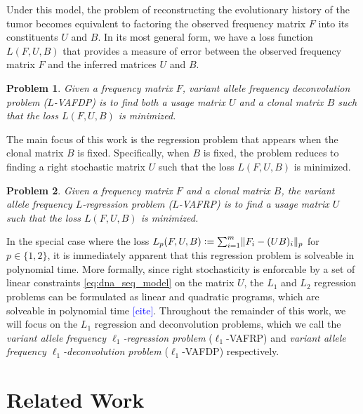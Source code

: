 \documentclass[10pt]{article}
\newtheorem{problem}{Problem}
\newcommand{\henri}[1]{\textcolor{blue}{[#1]}}
\newcommand{\defeq}{\vcentcolon=}
\begin{document}
Under this model, the problem of reconstructing the evolutionary history of the tumor
becomes equivalent to factoring the observed frequency matrix $F$ into its constituents $U$ and $B$.
In its most general form, we have a loss function $L(F, U, B)$ that provides a measure of error 
between the observed frequency matrix $F$ and the inferred matrices $U$ and $B$.

\begin{problem}
  \label{prob:vafp}
  Given a frequency matrix $F$, \emph{variant allele frequency deconvolution problem} ($L$-VAFDP) is to
  find both a usage matrix $U$ and a clonal matrix $B$ such that the loss $L(F, U, B)$ is minimized.
\end{problem}

The main focus of this work is the regression problem that appears when the
clonal matrix $B$ is fixed. Specifically, when $B$ is fixed, the problem reduces to finding a 
right stochastic matrix $U$ such that the loss $L(F, U, B)$ is minimized. 

\begin{problem}
  \label{prob:vafpp}
  Given a frequency matrix $F$ and a clonal matrix $B$, the 
  \emph{variant allele frequency $L$-regression problem} ($L$-VAFRP) is to
  find a usage matrix $U$ such that the loss $L(F, U, B)$ is minimized.
\end{problem}

In the special case where the loss $L_p(F, U, B) \defeq \sum_{i=1}^m\lVert F_i - (UB)_i \rVert_p$ for $p \in \{1, 2\}$,
it is immediately apparent that this regression problem is solveable in polynomial time. 
More formally, since right stochasticity is enforcable by a set of linear constraints \eqref{eq:dna_seq_model} on the matrix $U$,
the $L_1$ and $L_2$ regression problems can be formulated as linear and quadratic programs, 
which are solveable in polynomial time \henri{cite}. Throughout the remainder of this work,
we will focus on the $L_1$ regression and deconvolution problems, which we call the 
\emph{variant allele frequency $\ell_1$-regression problem} ($\ell_1$-VAFRP) and 
\emph{variant allele frequency $\ell_1$-deconvolution problem} ($\ell_1$-VAFDP)
respectively.

\section{Related Work}
\end{document}
